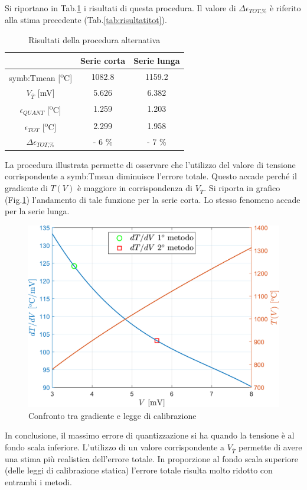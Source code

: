 Si riportano in Tab.\ref{tab:alternativa} i risultati di questa procedura. Il valore di $\Delta \epsilon_{\textit{TOT,\%}}$ è riferito alla stima precedente (Tab.\ref{tab:risultatitot}).

\begin{table}[H]
	\centering
	\begin{tabular}{c|c|c}
		\toprule
		\toprule
		& \textbf{Serie corta} & \textbf{Serie lunga}\\
		\midrule
		\gls{symb:Tmean} [\textsuperscript{o}C]& 1082.8 & 1159.2\\
		\midrule
		$V_{\overline{T}} $ [mV]& 5.626 & 6.382 \\
		\midrule
		$\epsilon_{\textit{QUANT}}$ [\textsuperscript{o}C]& 1.259 & 1.203 \\
		\midrule
		$\epsilon_{\textit{TOT}}$ [\textsuperscript{o}C]& 2.299 & 1.958\\
		\midrule
		$\Delta \epsilon_{\textit{TOT,\%}}$  & - 6 \% & - 7 \% \\
		\bottomrule
		\bottomrule
	\end{tabular}
	\caption{Risultati della procedura alternativa}
	\label{tab:alternativa}
\end{table}
La procedura illustrata permette di osservare che l'utilizzo del valore di tensione corrispondente a \gls{symb:Tmean} diminuisce l'errore totale. Questo accade perché il gradiente di $T(V)$ è maggiore in corrispondenza di $V_{\overline{T}}$. Si riporta in grafico (Fig.\ref{fig:confronto}) l'andamento di tale funzione per la serie corta. Lo stesso fenomeno accade per la serie lunga. 
\begin{figure}
	\centering
	\includegraphics[width=0.6\linewidth]{"../sperimentazione nei propulsori/confronto"}
	\caption{Confronto tra gradiente e legge di calibrazione}
	\label{fig:confronto}
\end{figure}

In conclusione, il massimo errore di quantizzazione si ha quando la tensione è al fondo scala inferiore. L'utilizzo di un valore corrispondente a $V_{\overline{T}}$
permette di avere una stima più realistica dell'errore totale. In proporzione al fondo scala superiore (delle leggi di calibrazione statica) l'errore totale risulta molto ridotto con entrambi i metodi. 
